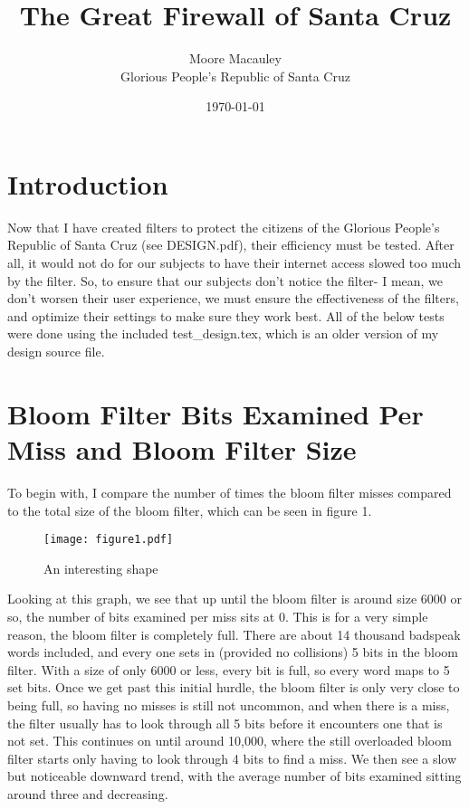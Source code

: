 \documentclass[11pt]{article}
\title{The Great Firewall of Santa Cruz}
\author{Moore Macauley \\ Glorious People's Republic of Santa Cruz}
\date{\today}
\begin{document}
\maketitle

\section{Introduction}

Now that I have created filters to protect the citizens of the Glorious People's Republic of Santa Cruz (see DESIGN.pdf), their efficiency must be tested. After all, it would not do for our subjects to have their internet access slowed too much by the filter. So, to ensure that our subjects don't notice the filter- I mean, we don't worsen their user experience, we must ensure the effectiveness of the filters, and optimize their settings to make sure they work best. All of the below tests were done using the included test\_design.tex, which is an older version of my design source file.

\section{Bloom Filter Bits Examined Per Miss and Bloom Filter Size}

To begin with, I compare the number of times the bloom filter misses compared to the total size of the bloom filter, which can be seen in figure 1.

\begin{figure}[tbp]
\begin{centering}
\texttt{[image: figure1.pdf]}
\caption{An interesting shape}
\end{centering}
\end{figure}

Looking at this graph, we see that up until the bloom filter is around size 6000 or so, the number of bits examined per miss sits at 0. This is for a very simple reason, the bloom filter is completely full. There are about 14 thousand badspeak words included, and every one sets in (provided no collisions) 5 bits in the bloom filter. With a size of only 6000 or less, every bit is full, so every word maps to 5 set bits. Once we get past this initial hurdle, the bloom filter is only very close to being full, so having no misses is still not uncommon, and when there is a miss, the filter usually has to look through all 5 bits before it encounters one that is not set. This continues on until around 10,000, where the still overloaded bloom filter starts only having to look through 4 bits to find a miss. We then see a slow but noticeable downward trend, with the average number of bits examined sitting around three and decreasing.
\end{document}
